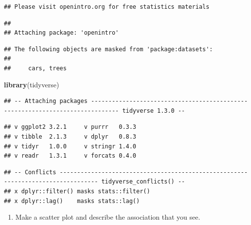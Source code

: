 \documentclass[]{article}
\newenvironment{Shaded}{\begin{snugshade}}{\end{snugshade}}
\newcommand{\DataTypeTok}[1]{\textcolor[rgb]{0.13,0.29,0.53}{#1}}
\newcommand{\KeywordTok}[1]{\textcolor[rgb]{0.13,0.29,0.53}{\textbf{#1}}}
\newcommand{\NormalTok}[1]{#1}
\newcommand{\OperatorTok}[1]{\textcolor[rgb]{0.81,0.36,0.00}{\textbf{#1}}}
\newcommand{\StringTok}[1]{\textcolor[rgb]{0.31,0.60,0.02}{#1}}
\providecommand{\tightlist}{%
  \setlength{\itemsep}{0pt}\setlength{\parskip}{0pt}}
\begin{document}
\begin{verbatim}
## Please visit openintro.org for free statistics materials
\end{verbatim}

\begin{verbatim}
## 
## Attaching package: 'openintro'
\end{verbatim}

\begin{verbatim}
## The following objects are masked from 'package:datasets':
## 
##     cars, trees
\end{verbatim}

\begin{Shaded}
\begin{Highlighting}[]
\KeywordTok{library}\NormalTok{(tidyverse)}
\end{Highlighting}
\end{Shaded}

\begin{verbatim}
## -- Attaching packages ------------------------------------------------------------------------------ tidyverse 1.3.0 --
\end{verbatim}

\begin{verbatim}
## v ggplot2 3.2.1     v purrr   0.3.3
## v tibble  2.1.3     v dplyr   0.8.3
## v tidyr   1.0.0     v stringr 1.4.0
## v readr   1.3.1     v forcats 0.4.0
\end{verbatim}

\begin{verbatim}
## -- Conflicts --------------------------------------------------------------------------------- tidyverse_conflicts() --
## x dplyr::filter() masks stats::filter()
## x dplyr::lag()    masks stats::lag()
\end{verbatim}

\begin{enumerate}
\def\labelenumi{\arabic{enumi}.}
\setcounter{enumi}{1}
\tightlist
\item
  Make a scatter plot and describe the association that you see.
\end{enumerate}

\begin{Shaded}
\end{Shaded}
\end{document}
